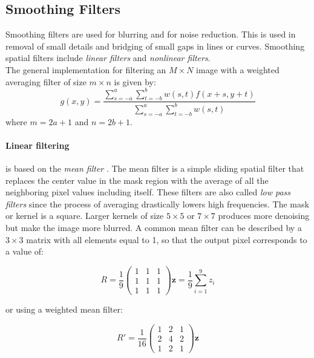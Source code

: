 \documentclass{standalone}
\begin{document}
\subsection{Smoothing Filters}
Smoothing filters are used for blurring and for noise reduction\cite{corrandconv}.
This is used in removal of small details and bridging of small gaps in lines or curves.
Smoothing spatial filters include \textit{linear filters} and \textit{nonlinear filters}\cite{corrandconv}.\\
The general implementation for filtering an $M \times N$ image with a weighted averaging filter of size $m \times n$ is given by:
\begin{equation}
    g(x, y) = \frac{\sum_{s = -a}^{a} \sum_{t = -b}^{b} w(s, t) f(x + s, y + t)}{\sum_{s = -a}^{a} \sum_{t = -b}^{b} w(s, t)}
\end{equation}
where $m=2a+1$ and $n=2b+1$.

\paragraph{Linear filtering} is based on the \textit{mean filter} \cite{filters}.
The mean filter is a simple sliding spatial filter that replaces the center value in the mask region with the average of all the neighboring pixel values including itself. 
These filters are also called \textit{low pass filters} since the process of averaging drastically lowers high frequencies.
The mask or kernel is a square.
Larger kernels of size $5\times5$ or $7\times7$ produces more denoising but make the image more blurred\cite{filters}. 
A common mean filter can be described by a $3\times3$ matrix with all elements equal to 1, so that the output pixel corresponds to a value of:

\begin{equation}
    R = \frac{1}{9} \begin{pmatrix}
        1 & 1 & 1\\
        1 & 1 & 1\\
        1 & 1 & 1
        \end{pmatrix} \mathbf{z} = \frac{1}{9} \sum_{i = 1}^{9}z_i
\end{equation}

 or using a weighted mean filter:

\begin{equation}
     R' = \frac{1}{16}\begin{pmatrix}
        1 & 2 & 1\\
        2 & 4 & 2\\
        1 & 2 & 1
        \end{pmatrix} \mathbf{z}
\end{equation}
\end{document}
